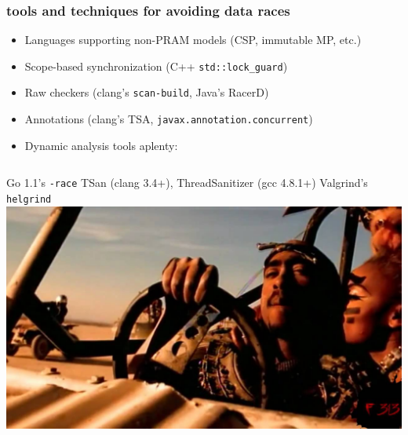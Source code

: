\documentclass{beamer}
\begin{document}
\begin{frame}
\frametitle{tools and techniques for avoiding data races}
\begin{itemize}
\item Languages supporting non-PRAM models (CSP, immutable MP, etc.)
\item Scope-based synchronization (C++ \texttt{std::lock\_guard})
\item Raw checkers (clang's {\texttt{scan-build}}, Java's RacerD)
\item Annotations (clang's TSA, {\texttt{javax.annotation.concurrent}})
\item Dynamic analysis tools aplenty:
\end{itemize}
\vfill
\begin{columns}
Go 1.1's \texttt{-race}
\vfill
TSan (clang 3.4+), ThreadSanitizer (gcc 4.8.1+)
\vfill
Valgrind's \texttt{helgrind}
\includegraphics[width=1\textwidth]{maxresdefault.jpg}
\end{columns}
\end{frame}
\end{document}
